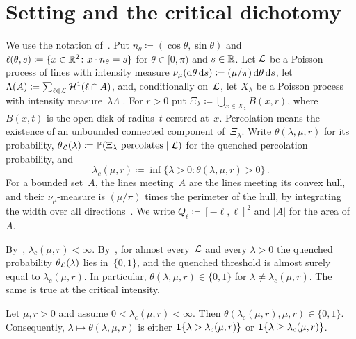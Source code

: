 \documentclass[11pt,letterpaper]{article}
\begin{document}
\section{Setting and the critical dichotomy}
\label{sec:setting}

We use the notation of~\cite{HJ26,HJ26sub}. Put $n_\theta\coloneqq(\cos\theta,\sin\theta)$ and $\ell(\theta,s)\coloneqq\{x\in\mathbb R^2\colon x\cdot n_\theta=s\}$ for $\theta\in[0,\pi)$ and $s\in\mathbb R$. Let $\mathcal L$ be a Poisson process of lines with intensity measure $\nu_\mu(\mathrm{d}\theta\,\mathrm{d} s)\coloneqq(\mu/\pi)\,\mathrm{d}\theta\,\mathrm{d} s$, let $\Lambda(A)\coloneqq\sum_{\ell\in\mathcal L}\mathcal H^1(\ell\cap A)$, and, conditionally on~$\mathcal L$, let $X_\lambda$ be a Poisson process with intensity measure~$\lambda\Lambda$ \cite[Theorem~5.6]{LP17}. For $r>0$ put $\Xi_\lambda\coloneqq\bigcup_{x\in X_\lambda}B(x,r)$, where $B(x,t)$ is the open disk of radius~$t$ centred at~$x$. Percolation means the existence of an unbounded connected component of~$\Xi_\lambda$. Write $\theta(\lambda,\mu,r)$ for its probability, $\theta_\mathcal L(\lambda)\coloneqq\mathbb P(\Xi_\lambda\text{ percolates}\mid\mathcal L)$ for the quenched percolation probability, and
\begin{equation*}
  \lambda_c(\mu,r)\coloneqq\inf\{\lambda>0\colon\theta(\lambda,\mu,r)>0\}\,.
\end{equation*}
For a bounded set~$A$, the lines meeting~$A$ are the lines meeting its convex hull, and their $\nu_\mu$-measure is $(\mu/\pi)$ times the perimeter of the hull, by integrating the width over all directions~\cite[Theorem~8.4.4]{SW08}. We write $Q_\ell\coloneqq[-\ell,\ell]^2$ and $\lvert A\rvert$ for the area of~$A$.

By~\cite[Theorem~2.1]{HJ26}, $\lambda_c(\mu,r)<\infty$. By~\cite[Proposition~3.3]{HJ26sub}, for almost every~$\mathcal L$ and every $\lambda>0$ the quenched probability $\theta_\mathcal L(\lambda)$ lies in~$\{0,1\}$, and the quenched threshold is almost surely equal to $\lambda_c(\mu,r)$. In particular, $\theta(\lambda,\mu,r)\in\{0,1\}$ for $\lambda\ne\lambda_c(\mu,r)$. The same is true at the critical intensity.

\begin{proposition}
\label{prop:dichotomy}
Let $\mu,r>0$ and assume $0<\lambda_c(\mu,r)<\infty$. Then $\theta(\lambda_c(\mu,r),\mu,r)\in\{0,1\}$. Consequently, $\lambda\mapsto\theta(\lambda,\mu,r)$ is either $\mathbf{1}\{\lambda>\lambda_c(\mu,r)\}$ or $\mathbf{1}\{\lambda\ge\lambda_c(\mu,r)\}$.
\end{proposition}
\end{document}

